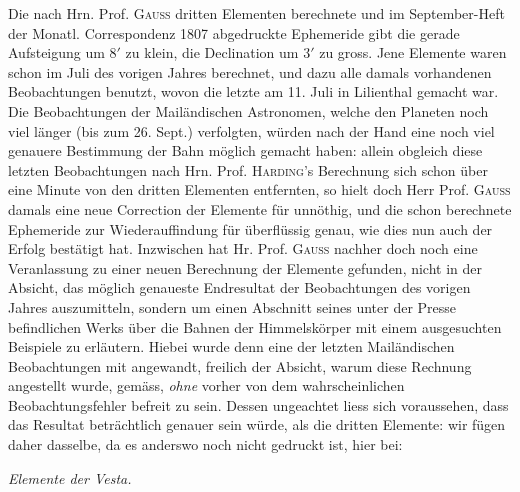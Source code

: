 \par\indent Die nach Hrn. Prof. \textsc{Gauss} dritten Elementen berechnete und im September-Heft der
Monatl. Correspondenz 1807 abgedruckte Ephemeride gibt die gerade Aufsteigung um $8'$
zu klein, die Declination um $3'$ zu gross. Jene Elemente waren schon im Juli des
vorigen Jahres berechnet, und dazu alle damals vorhandenen Beobachtungen benutzt,
wovon die letzte am 11. Juli in Lilienthal gemacht war. Die Beobachtungen der
Mailändischen Astronomen, welche den Planeten noch viel länger (bis zum 26. Sept.)
verfolgten, würden nach der Hand eine noch viel genauere Bestimmung der Bahn möglich
gemacht haben: allein obgleich diese letzten Beobachtungen nach Hrn. Prof. \textsc{Harding}'s
Berechnung sich schon über eine Minute von den dritten Elementen entfernten, so
hielt doch Herr Prof. \textsc{Gauss} damals eine neue Correction der Elemente für unnöthig,
und die schon berechnete Ephemeride zur Wiederauffindung für überflüssig genau, wie
dies nun auch der Erfolg bestätigt hat. Inzwischen hat Hr. Prof. \textsc{Gauss} nachher doch
noch eine Veranlassung zu einer neuen Berechnung der Elemente gefunden, nicht in der
Absicht, das möglich genaueste Endresultat der Beobachtungen des vorigen Jahres
auszumitteln, sondern um einen Abschnitt seines unter der Presse befindlichen Werks
über die Bahnen der Himmelskörper mit einem ausgesuchten Beispiele zu erläutern.
Hiebei wurde denn eine der letzten Mailändischen Beobachtungen mit angewandt, freilich der Absicht, warum diese Rechnung
angestellt wurde, gemäss, \emph{ohne} vorher von dem wahrscheinlichen
Beobachtungsfehler befreit zu sein. Dessen ungeachtet liess sich voraussehen, dass
das Resultat beträchtlich genauer sein würde, als die dritten Elemente: wir fügen
daher dasselbe, da es anderswo noch nicht gedruckt ist, hier bei:

\begin{center}
\emph{Elemente der Vesta.}
\end{center}


